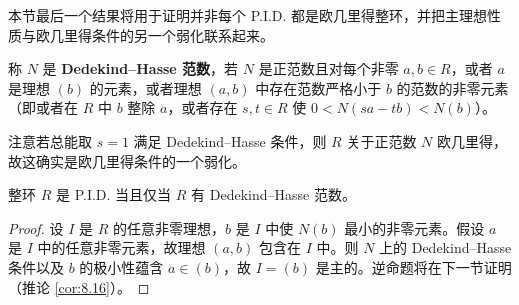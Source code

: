 本节最后一个结果将用于证明并非每个 P.I.D. 都是欧几里得整环，并把主理想性质与欧几里得条件的另一个弱化联系起来。

\begin{definition}
称 \(N\) 是 \textbf{Dedekind--Hasse 范数}，若 \(N\) 是正范数且对每个非零 \(a, b \in R\)，或者 \(a\) 是理想 \((b)\) 的元素，或者理想 \((a, b)\) 中存在范数严格小于 \(b\) 的范数的非零元素（即或者在 \(R\) 中 \(b\) 整除 \(a\)，或者存在 \(s, t \in R\) 使 \(0 < N(sa - tb) < N(b)\)）。
\end{definition}

注意若总能取 \(s = 1\) 满足 Dedekind--Hasse 条件，则 \(R\) 关于正范数 \(N\) 欧几里得，故这确实是欧几里得条件的一个弱化。

\begin{proposition}\label{pro:8.9}
整环 \(R\) 是 P.I.D. 当且仅当 \(R\) 有 Dedekind--Hasse 范数。
\end{proposition}

\begin{proof}
设 \(I\) 是 \(R\) 的任意非零理想，\(b\) 是 \(I\) 中使 \(N(b)\) 最小的非零元素。假设 \(a\) 是 \(I\) 中的任意非零元素，故理想 \((a, b)\) 包含在 \(I\) 中。则 \(N\) 上的 Dedekind--Hasse 条件以及 \(b\) 的极小性蕴含 \(a \in (b)\)，故 \(I = (b)\) 是主的。逆命题将在下一节证明（推论 \ref{cor:8.16}）。
\end{proof}

